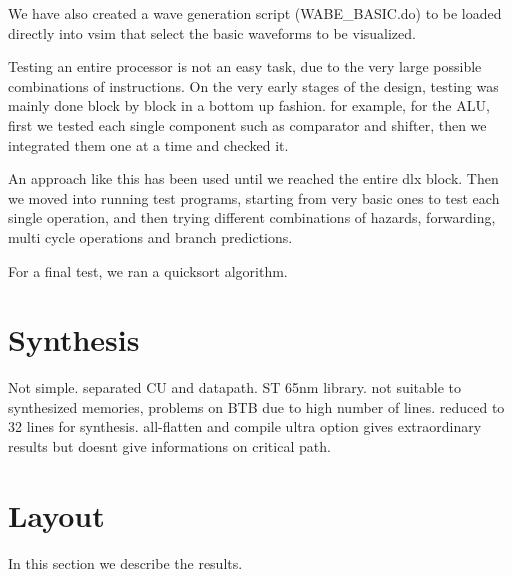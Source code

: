 \documentclass[12pt]{article}
\begin{document}
We have also created a wave generation script (WABE\_BASIC.do) to be loaded directly into vsim that select the basic waveforms to be visualized.

Testing an entire processor is not an easy task, due to the very large possible combinations of instructions.
On the very early stages of the design, testing was mainly done block by block in a bottom up fashion. for example, for the ALU, first we tested each single component such as comparator and shifter, then we integrated them one at a time and checked it.

An approach like this has been used until we reached the entire dlx block.
Then we moved into running test programs, starting from very basic ones to test each single operation, and then trying different combinations of hazards, forwarding, multi cycle operations and branch predictions.

For a final test, we ran a quicksort algorithm.

  

\section{Synthesis}\label{Synthesis}
Not simple. separated CU and datapath.
ST 65nm library. not suitable to synthesized memories, problems on BTB due to high number of lines. reduced to 32 lines for synthesis. 
all-flatten and compile ultra option gives extraordinary results but doesnt give informations on critical path.



\section{Layout}\label{Layout}
In this section we describe the results.



\end{document}
